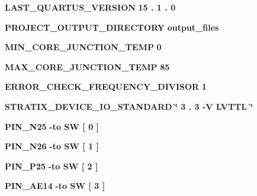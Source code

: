 \begin{DoxyCompactItemize}
{\bf L\+A\+S\+T\+\_\+\+Q\+U\+A\+R\+T\+U\+S\+\_\+\+V\+E\+R\+S\+I\+ON} {\bfseries  \textcolor{vhdldigit}{15} \textcolor{vhdlchar}{.} \textcolor{vhdldigit}{1} \textcolor{vhdlchar}{.} \textcolor{vhdldigit}{0} \textcolor{vhdlchar}{ }} 
\item 
{\bf P\+R\+O\+J\+E\+C\+T\+\_\+\+O\+U\+T\+P\+U\+T\+\_\+\+D\+I\+R\+E\+C\+T\+O\+RY} {\bfseries \textcolor{vhdlchar}{output\+\_\+files}\textcolor{vhdlchar}{ }} 
\item 
{\bf M\+I\+N\+\_\+\+C\+O\+R\+E\+\_\+\+J\+U\+N\+C\+T\+I\+O\+N\+\_\+\+T\+E\+MP} {\bfseries  \textcolor{vhdldigit}{0} \textcolor{vhdlchar}{ }} 
\item 
{\bf M\+A\+X\+\_\+\+C\+O\+R\+E\+\_\+\+J\+U\+N\+C\+T\+I\+O\+N\+\_\+\+T\+E\+MP} {\bfseries  \textcolor{vhdldigit}{85} \textcolor{vhdlchar}{ }} 
\item 
{\bf E\+R\+R\+O\+R\+\_\+\+C\+H\+E\+C\+K\+\_\+\+F\+R\+E\+Q\+U\+E\+N\+C\+Y\+\_\+\+D\+I\+V\+I\+S\+OR} {\bfseries  \textcolor{vhdldigit}{1} \textcolor{vhdlchar}{ }} 
\item 
{\bf S\+T\+R\+A\+T\+I\+X\+\_\+\+D\+E\+V\+I\+C\+E\+\_\+\+I\+O\+\_\+\+S\+T\+A\+N\+D\+A\+RD} {\bfseries \textcolor{vhdlchar}{\char`\"{}}\textcolor{vhdlchar}{ } \textcolor{vhdldigit}{3} \textcolor{vhdlchar}{.} \textcolor{vhdldigit}{3} \textcolor{vhdlchar}{-\/}\textcolor{vhdlchar}{V}\textcolor{vhdlchar}{ }\textcolor{vhdlchar}{L\+V\+T\+TL}\textcolor{vhdlchar}{ }\textcolor{vhdlchar}{\char`\"{}}\textcolor{vhdlchar}{ }} 
\item 
{\bf P\+I\+N\+\_\+\+N25} {\bfseries \textcolor{vhdlchar}{-\/}\textcolor{keywordflow}{to}\textcolor{vhdlchar}{ }\textcolor{vhdlchar}{SW}\textcolor{vhdlchar}{ }\textcolor{vhdlchar}{[}\textcolor{vhdlchar}{ } \textcolor{vhdldigit}{0} \textcolor{vhdlchar}{ }\textcolor{vhdlchar}{]}\textcolor{vhdlchar}{ }} 
\item 
{\bf P\+I\+N\+\_\+\+N26} {\bfseries \textcolor{vhdlchar}{-\/}\textcolor{keywordflow}{to}\textcolor{vhdlchar}{ }\textcolor{vhdlchar}{SW}\textcolor{vhdlchar}{ }\textcolor{vhdlchar}{[}\textcolor{vhdlchar}{ } \textcolor{vhdldigit}{1} \textcolor{vhdlchar}{ }\textcolor{vhdlchar}{]}\textcolor{vhdlchar}{ }} 
\item 
{\bf P\+I\+N\+\_\+\+P25} {\bfseries \textcolor{vhdlchar}{-\/}\textcolor{keywordflow}{to}\textcolor{vhdlchar}{ }\textcolor{vhdlchar}{SW}\textcolor{vhdlchar}{ }\textcolor{vhdlchar}{[}\textcolor{vhdlchar}{ } \textcolor{vhdldigit}{2} \textcolor{vhdlchar}{ }\textcolor{vhdlchar}{]}\textcolor{vhdlchar}{ }} 
\item 
{\bf P\+I\+N\+\_\+\+A\+E14} {\bfseries \textcolor{vhdlchar}{-\/}\textcolor{keywordflow}{to}\textcolor{vhdlchar}{ }\textcolor{vhdlchar}{SW}\textcolor{vhdlchar}{ }\textcolor{vhdlchar}{[}\textcolor{vhdlchar}{ } \textcolor{vhdldigit}{3} \textcolor{vhdlchar}{ }\textcolor{vhdlchar}{]}\textcolor{vhdlchar}{ }} 

\end{DoxyCompactItemize}
